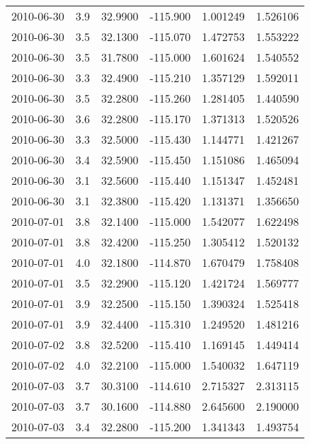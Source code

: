 \begin{tabular}{lrrrrr}
2010-06-30 &       3.9 &  32.9900 &  -115.900 &         1.001249 &         1.526106 \\
2010-06-30 &       3.5 &  32.1300 &  -115.070 &         1.472753 &         1.553222 \\
2010-06-30 &       3.5 &  31.7800 &  -115.000 &         1.601624 &         1.540552 \\
2010-06-30 &       3.3 &  32.4900 &  -115.210 &         1.357129 &         1.592011 \\
2010-06-30 &       3.5 &  32.2800 &  -115.260 &         1.281405 &         1.440590 \\
2010-06-30 &       3.6 &  32.2800 &  -115.170 &         1.371313 &         1.520526 \\
2010-06-30 &       3.3 &  32.5000 &  -115.430 &         1.144771 &         1.421267 \\
2010-06-30 &       3.4 &  32.5900 &  -115.450 &         1.151086 &         1.465094 \\
2010-06-30 &       3.1 &  32.5600 &  -115.440 &         1.151347 &         1.452481 \\
2010-06-30 &       3.1 &  32.3800 &  -115.420 &         1.131371 &         1.356650 \\
2010-07-01 &       3.8 &  32.1400 &  -115.000 &         1.542077 &         1.622498 \\
2010-07-01 &       3.8 &  32.4200 &  -115.250 &         1.305412 &         1.520132 \\
2010-07-01 &       4.0 &  32.1800 &  -114.870 &         1.670479 &         1.758408 \\
2010-07-01 &       3.5 &  32.2900 &  -115.120 &         1.421724 &         1.569777 \\
2010-07-01 &       3.9 &  32.2500 &  -115.150 &         1.390324 &         1.525418 \\
2010-07-01 &       3.9 &  32.4400 &  -115.310 &         1.249520 &         1.481216 \\
2010-07-02 &       3.8 &  32.5200 &  -115.410 &         1.169145 &         1.449414 \\
2010-07-02 &       4.0 &  32.2100 &  -115.000 &         1.540032 &         1.647119 \\
2010-07-03 &       3.7 &  30.3100 &  -114.610 &         2.715327 &         2.313115 \\
2010-07-03 &       3.7 &  30.1600 &  -114.880 &         2.645600 &         2.190000 \\
2010-07-03 &       3.4 &  32.2800 &  -115.200 &         1.341343 &         1.493754 \\

\end{tabular}
